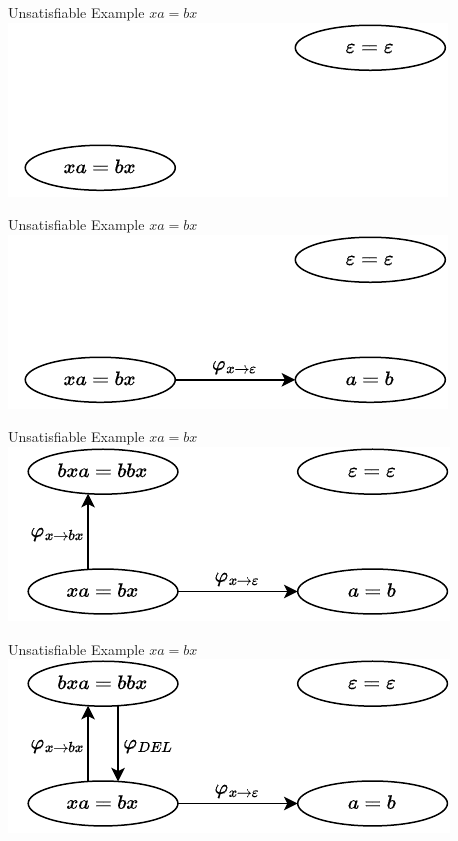 \documentclass[xcolor=table]{beamer}
\begin{document}
\begin{frame}{Unsatisfiable Example $xa = bx$}
\includegraphics[]{images/xa_bx/xa_bx-1.pdf}
\end{frame}

\begin{frame}{Unsatisfiable Example $xa = bx$}
\includegraphics[]{images/xa_bx/xa_bx-2.pdf}
\end{frame}

\begin{frame}{Unsatisfiable Example $xa = bx$}
\includegraphics[]{images/xa_bx/xa_bx-3.pdf}
\end{frame}

\begin{frame}{Unsatisfiable Example $xa = bx$}
\includegraphics[]{images/xa_bx/xa_bx-4.pdf}
\end{frame}
\end{document}
